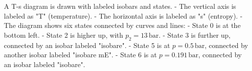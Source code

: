 A T-s diagram is drawn with labeled isobars and states.  
- The vertical axis is labeled as "T" (temperature).  
- The horizontal axis is labeled as "s" (entropy).  
- The diagram shows six states connected by curves and lines:  
  - State 0 is at the bottom left.  
  - State 2 is higher up, with \( p_2 = 13 \, \text{bar} \).  
  - State 3 is further up, connected by an isobar labeled "isobare".  
  - State 5 is at \( p = 0.5 \, \text{bar} \), connected by another isobar labeled "isobare mE".  
  - State 6 is at \( p = 0.191 \, \text{bar} \), connected by an isobar labeled "isobare".